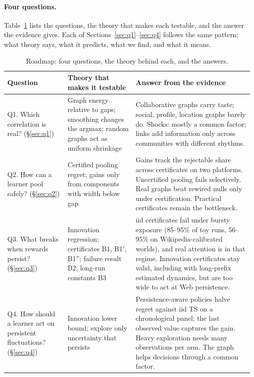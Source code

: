 \documentclass[11pt]{article}
\theoremstyle{definition}
\theoremstyle{remark}
\begin{document}
\paragraph{Four questions.} Table~\ref{tab:roadmap} lists the questions, the theory that makes each testable, and the answer the evidence gives. Each of Sections~\ref{sec:q1}--\ref{sec:q4} follows the same pattern: what theory says, what it predicts, what we find, and what it means.

\begin{table}[t]\centering\small
\begin{tabularx}{\linewidth}{p{2.7cm}p{4.2cm}X}
\toprule
Question & Theory that makes it testable & Answer from the evidence \\
\midrule
Q1. Which correlation is real? (\S\ref{sec:q1}) & Graph energy relative to gaps; smoothing changes the argmax; random graphs act as uniform shrinkage & Collaborative graphs carry taste; social, profile, location graphs barely do. Shocks: mostly a common factor; links add information only across communities with different rhythms. \\
Q2. How can a learner pool safely? (\S\ref{sec:q2}) & Certified pooling regret; gains only from components with width below gap & Gains track the rejectable share across certificates on two platforms. Uncertified pooling fails selectively. Real graphs beat rewired nulls only under certification. Practical certificates remain the bottleneck. \\
Q3. What breaks when rewards persist? (\S\ref{sec:q3}) & Innovation regression; certificates B1, B1$'$, B1$''$; failure result B2; long-run constants B3 & iid certificates fail under bursty exposure (85--95\% of toy runs, 56--95\% on Wikipedia-calibrated worlds), and real attention is in that regime. Innovation certificates stay valid, including with long-prefix estimated dynamics, but are too wide to act at Web persistence. \\
Q4. How should a learner act on persistent fluctuations? (\S\ref{sec:q4}) & Innovation lower bound; explore only uncertainty that persists & Persistence-aware policies halve regret against iid TS on a chronological panel; the last observed value captures the gain. Heavy exploration needs many observations per arm. The graph helps decisions through a common factor. \\
\bottomrule
\end{tabularx}
\caption{Roadmap: four questions, the theory behind each, and the answers.}\label{tab:roadmap}
\end{table}
\end{document}
